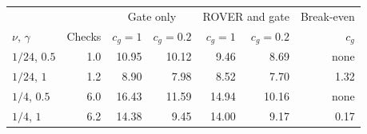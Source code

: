 \scriptsize
\setlength{\tabcolsep}{3pt}
\begin{tabular}{@{}l r rr rr r@{}}
\toprule
& & \multicolumn{2}{c}{Gate only} & \multicolumn{2}{c}{ROVER and gate} & Break-even \\
$\nu$, $\gamma$ & Checks & $c_g{=}1$ & $c_g{=}0.2$ & $c_g{=}1$ & $c_g{=}0.2$ & $c_g$ \\
\midrule
$1/24$, $0.5$ & 1.0 & 10.95 & 10.12 & 9.46 & 8.69 & none \\
$1/24$, $1$ & 1.2 & 8.90 & 7.98 & 8.52 & 7.70 & 1.32 \\
$1/4$, $0.5$ & 6.0 & 16.43 & 11.59 & 14.94 & 10.16 & none \\
$1/4$, $1$ & 6.2 & 14.38 & 9.45 & 14.00 & 9.17 & 0.17 \\
\bottomrule
\end{tabular}

